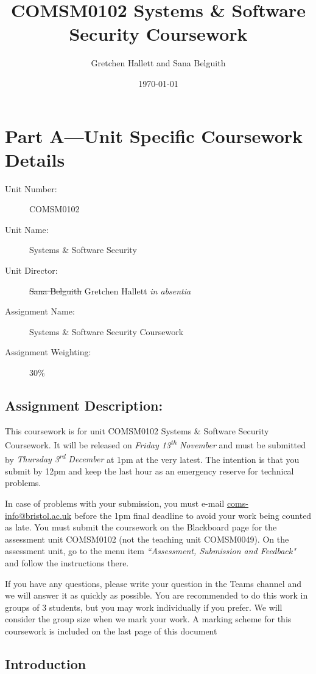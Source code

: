 \documentclass{article}
\title{COMSM0102 Systems \& Software Security Coursework}
\author{Gretchen Hallett and Sana Belguith}
\date\today
\newcommand\releasedate[0]{Friday 13\textsuperscript{th} November}
\newcommand\duedate[0]{Thursday 3\textsuperscript{rd} December}
\begin{document}
\maketitle
\section*{Part A---Unit Specific Coursework Details}

\begin{description}
\item[Unit Number:] COMSM0102
\item[Unit Name:] Systems \& Software Security
\item[Unit Director:] \sout{Sana Belguith} Gretchen Hallett \emph{in absentia}
\item[Assignment Name:] Systems \& Software Security Coursework
\item[Assignment Weighting:] 30\%
\end{description}

\subsection*{Assignment Description:}

This coursework is for unit COMSM0102 Systems \& Software Security
Coursework. It will be released on \emph{\releasedate} and must be
submitted by \emph{\duedate} at 1pm at the very latest. The
intention is that you submit by 12pm and keep the last hour as an
emergency reserve for technical problems.

In case of problems with your submission, you must e-mail
\href{mailto://coms-info@bristol.ac.uk}{coms-info@bristol.ac.uk}
before the 1pm final deadline to avoid your work being counted as
late. You must submit the coursework on the Blackboard page for the
assessment unit COMSM0102 (not the teaching unit COMSM0049). On the
assessment unit, go to the menu item \emph{``Assessment, Submission and
  Feedback"} and follow the instructions there.

If you have any questions, please write your question in the Teams
channel and we will answer it as quickly as possible. You are
recommended to do this work in groups of 3 students, but you may work
individually if you prefer. We will consider the group size when we mark
your work. A marking scheme for this coursework is included on the last
page of this document

\subsection*{Introduction}
\end{document}
